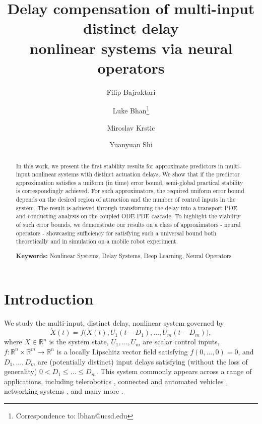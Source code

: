 \documentclass[letterpaper, 10 pt, conference]{ieeeconf}  %
\begin{document}
\title{
Delay compensation of multi-input distinct delay \\ nonlinear systems via
neural operators}

\author[1]{Filip Bajraktari}
\author[2]{Luke Bhan\thanks{Correspondence to: lbhan@ucsd.edu}}
\author[2]{Miroslav Krstic}
\author[2]{Yuanyuan Shi}


\makeatletter
\patchcmd{\@maketitle}{\AB@authlist}{\AB@authlist\vspace{-1.5em}}{}{}
\makeatother

\maketitle
\begin{abstract}
In this work, we present the first stability results for approximate predictors in multi-input nonlinear systems with distinct actuation delays. We show that if the predictor approximation satisfies a uniform (in time) error bound, semi-global practical stability is correspondingly achieved.  For such approximators, the required uniform error bound depends on the desired region of attraction and the number of control inputs in the system. The result is achieved through transforming the delay into a transport PDE and conducting analysis on the coupled ODE-PDE cascade. To highlight the viability of such error bounds, we demonstrate our results on a class of approximators - neural operators - showcasing sufficiency for satisfying such a universal bound both theoretically and in simulation on a mobile robot experiment. 
\vspace*{\baselineskip}

\noindent \textbf{Keywords:} Nonlinear Systems, Delay Systems, Deep Learning, Neural Operators
\end{abstract}

\section{Introduction} \label{sec:introduction}
We study the multi-input, distinct delay, nonlinear system governed by
\begin{equation}
    \dot{X}(t) = f \bigg( X(t), U_1(t-D_1), \dots, U_m(t-D_m) \bigg), \label{eq:system}
\end{equation}
where $X \in \mathbb{R}^n$ is the system state, $U_1, \dots, U_m$ are scalar control inputs, $f: \mathbb{R}^n \times \mathbb{R}^m \rightarrow \mathbb{R}^n$ is a locally Lipschitz vector field satisfying $f(0, \dots,0) = 0$, and $D_1, \dots, D_m$ are (potentially distinct) input delays satisfying (without the loss of generality) $0 < D_1 \leq \dots \leq D_m$. This system commonly appears across a range of applications, including telerobotics \cite{9727201}, connected and automated vehicles \cite{samii2025experimentalimplementationvalidationpredictorbased}, networking systems \cite{doi:10.1137/140980570}, and many more \cite{Bekiaris-Liberis_Krstic:2016}.
\end{document}
